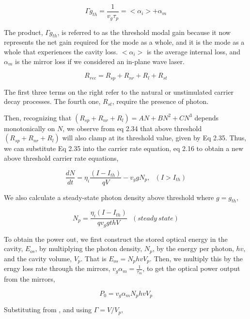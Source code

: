 \begin{equation}
  \Gamma{g_{th}} = \frac{1}{v_g\tau_p} = <\alpha_i> + \alpha_m
\end{equation}

The product, $\Gamma{g_{th}}$, is referred to as the threshold modal gain
because it now represents the net gain required for the mode as a whole, and it
is the mode as a whole that experiences the cavity loss. $<\alpha_i>$ is the
average internal loss, and $\alpha_m$ is the mirror loss if we considered an
in-plane wave laser.

\begin{equation}
  R_{rec} = R_{sp} + R_{nr} + R_{l} + R_{st}
\end{equation}

The first three terms on the right refer to the natural or unstimulated carrier
decay processes. The fourth one, $R_{st}$, require the presence of photon.


Then, recognizing that $(R_{sp} + R_{nr} + R_{l}) =AN + BN^2 +CN^3$ depends
monotonically on $N$, we observe from eq 2.34 that above threshold $(R_{sp} +
R_{nr} + R_{l})$ will also clamp at its threshold value, given by Eq 2.35. Thus,
we can substitute Eq 2.35 into the carrier rate equation, eq 2.16 to obtain a
new above threshold carrier rate equations,

\begin{equation}
  \frac{dN}{dt} = \eta_i \frac{(I - I_{th})}{qV} - v_{g}gN_p,~~~   (I > I_{th})
\end{equation}

We also calculate a steady-state photon density above threshold where $g = g_{th}$,

\begin{equation}
  N_p = \frac{\eta_i (I - I_{th})}{qv_{g}g{th}V}~~~   (steady~ state)
\end{equation}

To obtain the power out, we first construct the stored optical energy in the
cavity, $E_{os}$, by multiplying the photon density, $N_p$, by the energy per
photon, $hv$, and the cavity volume, $V_p$. That is $E_{os} = N_phvV_p$. Then,
we multiply this by the erngy loss rate through the mirrors, $v_g\alpha_m =
\frac{1}{\tau_m}$, to get the optical power output from the mirrors,

\begin{equation}
  P_0 = v_g\alpha_{m}N_phvV_p
\end{equation}

Substituting from , and using $\Gamma = V/V_p$,

